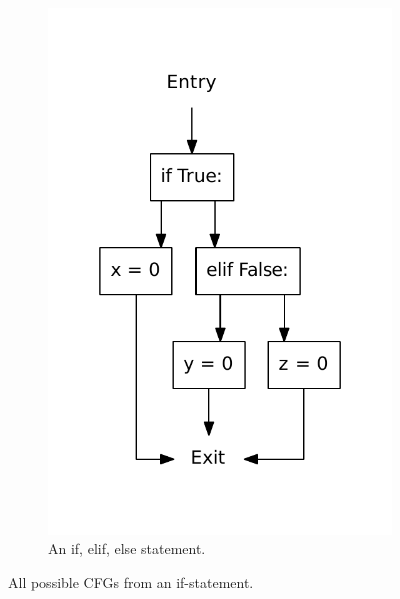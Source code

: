 \begin{figure}
\begin{subfigure}[b]{0.3\textwidth}
    \includegraphics[width=\textwidth]{./figures/if_else_elif.pdf}
    \caption{An if, elif, else statement.}
    \label{fig:if:if_elif_else}
  \end{subfigure}
  \caption{All possible CFGs from an if-statement.}
  \label{fig:if}
\end{figure}

